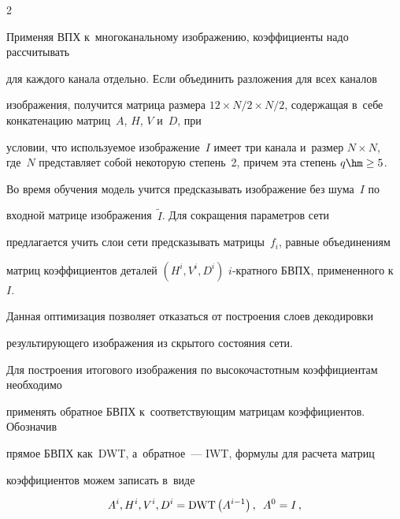 \begin{multicols}{2}





\noindent 


Применяя ВПХ к~многоканальному изображению, коэффициенты надо рассчитывать 


для каждого канала отдельно. Если объединить разложения для всех каналов 


изображения, получится матрица размера $12 \times {N}/{2} \times 


{N}/{2}$, содержащая в~себе конкатенацию матриц~$A$, $H$, $V$ и~$D$, при 


условии, что используемое изображение~$I$ имеет три канала и~размер $N \times 


N$, где~$N$ представляет собой некоторую степень~2, причем эта степень $q \hm\ge 5$.





Во время обучения модель учится предсказывать изоб\-ра\-же\-ние без шума~$I$ по 


входной матрице изоб\-ра\-же\-ния~$\tilde{I}$. Для сокращения параметров сети 


предлагается учить слои сети предсказывать матрицы~$f_i$, равные объединениям 


матриц коэффициентов деталей $(H^i, V^i, D^i)$ $i$-крат\-но\-го БВПХ, примененного к~$I$. 


Данная оптимизация позволяет отказаться от построения слоев декодировки 


результирующего изображения из скрытого состояния сети.





Для построения итогового изображения по высокочастотным коэффициентам необходимо 


применять обратное БВПХ к~соответствующим матрицам коэффициентов. Обозначив 


прямое БВПХ как~DWT, а~обратное~--- IWT, формулы для расчета матриц 


коэффициентов можем записать в~виде





\noindent


\begin{equation*}


A^i, H^i, V^i, D^i = \mathrm{DWT}\left(A^{i-1}\right),\enskip A^0 = I\,,



\end{equation*}
\end{multicols}
